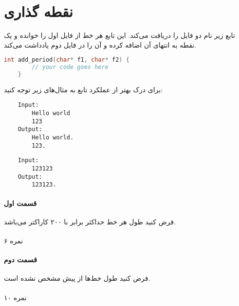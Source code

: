 \documentclass[../main.tex]{subfiles}
\begin{document}
\section{نقطه گذاری}
\paragraph{}
تابع زیر نام دو فایل را دریافت می‌کند.
این تابع هر خط از فایل اول را خوانده و یک نقطه
به انتهای آن اضافه کرده و آن را در فایل دوم یادداشت می‌کند.

\begin{latin}
\begin{lstlisting}[language=c]
    int add_period(char* f1, char* f2) {
        // your code goes here
    }
\end{lstlisting}
\end{latin}

برای درک بهتر از عملکرد تابع به مثال‌های زیر توجه کنید:

\begin{latin}
\begin{verbatim}
    Input:
        Hello world
        123
    Output:
        Hello world.
        123.
\end{verbatim}

\begin{verbatim}
    Input:
        123123
    Output:
        123123.
\end{verbatim}
\end{latin}

\paragraph{قسمت اول}
فرض کنید طول هر خط حداکثر برابر با ۲۰۰ کاراکتر می‌باشد.

\paragraph{}
۶ نمره

\paragraph{قسمت دوم}
فرض کنید طول خط‌ها از پیش مشخص نشده است.

\paragraph{}
۱۰ نمره
\end{document}
